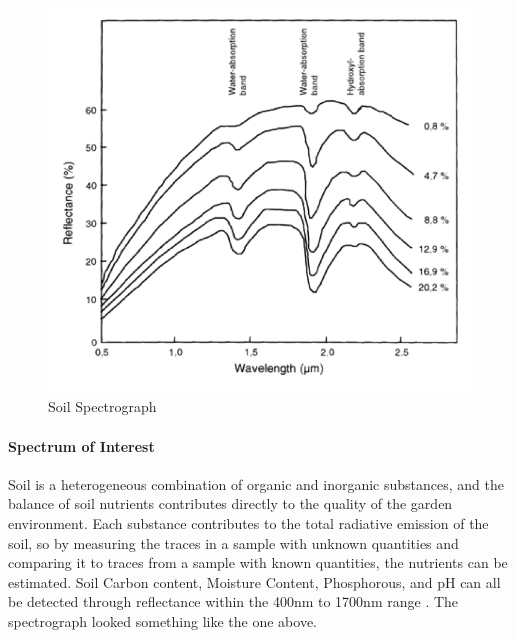 \begin{figure}[H]
    \caption{Soil Spectrograph}
    \centering
    \includegraphics[scale=0.5]{images/GenericSoilSpectra.png}
\end{figure}

\paragraph{Spectrum of Interest} Soil is a heterogeneous combination of organic and inorganic substances, and the balance of soil nutrients contributes directly to the quality of the garden environment. Each substance contributes to the total radiative emission of the soil, so by measuring the traces in a sample with unknown quantities and comparing it to traces from a sample with known quantities, the nutrients can be estimated. Soil Carbon content, Moisture Content, Phosphorous, and pH can all be detected through reflectance within the 400nm to 1700nm range \cite{Mouazen2007}. The spectrograph looked something like the one above.